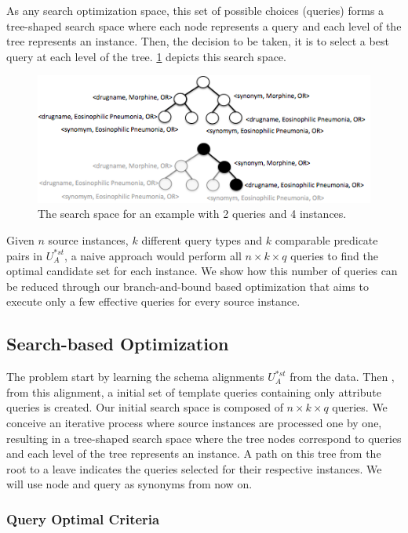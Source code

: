 As any search optimization space, this set of possible choices (queries) forms a tree-shaped search space where each node represents a query and each level of the tree represents an instance. Then, the decision to be taken, it is to select a best query at each level of the tree. \ref{fig:sspace} depicts this search space.

 \begin{figure} 
\vspace{-20pt}
\centering
\includegraphics[scale=0.5]{p22.png}
\caption{The search space for an example with 2 queries and 4 instances.} 
\vspace{-30pt}
\label{fig:sspace}
\end{figure}

Given $n$ source instances, $k$ different query types and $k$ comparable predicate pairs in $U^{*st}_A$, a naive approach would perform all $n \times k \times q$ queries to find the optimal candidate set for each instance. We show how this number of queries can be reduced through our branch-and-bound based optimization that aims to execute only a few effective queries for every source instance. 
 
\subsection{Search-based Optimization} 
The problem start by learning the schema alignments $U^{*st}_A$ from the data. Then , from this alignment, a initial set of template queries containing only attribute queries is created. Our initial search space is composed of $n \times k \times q$ queries. We conceive an iterative process where source instances are processed one by one, resulting in a tree-shaped search space where the tree nodes correspond to queries and each level of the tree represents an instance.  A path on this tree from the root to a leave indicates the queries selected for their respective instances. We will use node and query as synonyms from now on.

\subsubsection{Query Optimal Criteria} 

